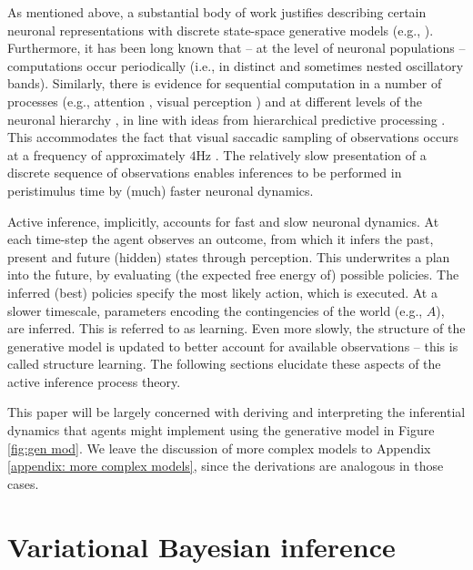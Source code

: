 \documentclass{article}
\begin{document}
As mentioned above, a substantial body of work justifies describing certain neuronal representations with discrete state-space generative models (e.g., \cite{zhangDiscreteFixedResolutionRepresentations2008,luckCapacityVisualWorking1997,teeInformationBrainRepresented2018}). Furthermore, it has been long known that -- at the level of neuronal populations -- computations occur periodically (i.e., in distinct and sometimes nested oscillatory bands). Similarly, there is evidence for sequential computation in a number of processes (e.g., attention \cite{buschmanShiftingSpotlightAttention2010,duncanDirectMeasurementAttentional1994,landauAttentionSamplesStimuli2012}, visual perception \cite{hanslmayrPrestimulusOscillatoryPhase2013,rollsProcessingSpeedCerebral1994}) and at different levels of the neuronal hierarchy \cite{fristonDeepTemporalModels2018,fristonHierarchicalModelsBrain2008}, in line with ideas from hierarchical predictive processing \cite{chaoLargeScaleCorticalNetworks2018,iglesiasHierarchicalPredictionErrors2013}. This accommodates the fact that visual saccadic sampling of observations occurs at a frequency of approximately $4$Hz \cite{parrDiscreteContinuousBrain2018}. The relatively slow presentation of a discrete sequence of observations enables inferences to be performed in peristimulus time by (much) faster neuronal dynamics.

Active inference, implicitly, accounts for fast and slow neuronal dynamics. At each time-step the agent observes an outcome, from which it infers the past, present and future (hidden) states through perception. This underwrites a plan into the future, by evaluating (the expected free energy of) possible policies. The inferred (best) policies specify the most likely action, which is executed. At a slower timescale, parameters encoding the contingencies of the world (e.g., $A$), are inferred. This is referred to as learning. Even more slowly, the structure of the generative model is updated to better account for available observations -- this is called structure learning. The following sections elucidate these aspects of the active inference process theory.

This paper will be largely concerned with deriving and interpreting the inferential dynamics that agents might implement using the generative model in Figure \ref{fig:gen mod}. We leave the discussion of more complex models to Appendix \ref{appendix: more complex models}, since the derivations are analogous in those cases.

\section{Variational Bayesian inference}
\label{sec: VB}
\end{document}

